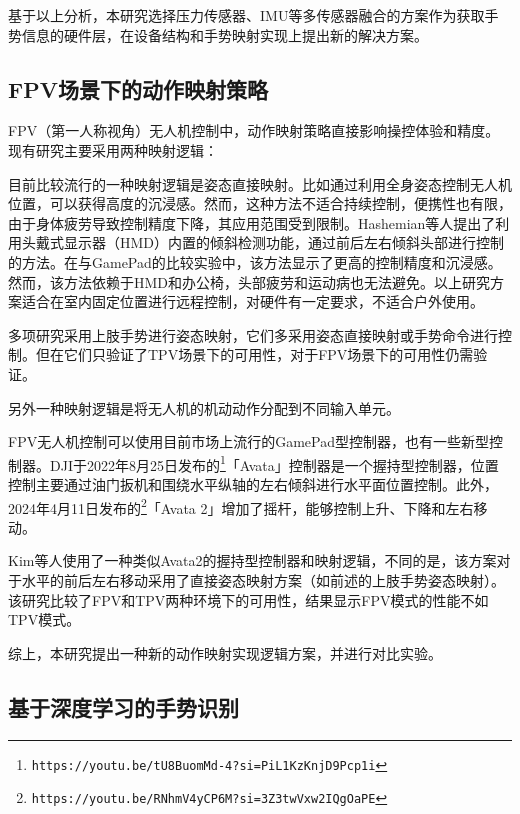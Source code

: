 基于以上分析，本研究选择压力传感器、IMU等多传感器融合的方案作为获取手势信息的硬件层，在设备结构和手势映射实现上提出新的解决方案。

\subsection{FPV场景下的动作映射策略}\label{ssec:FPV-drone-rc}

FPV（第一人称视角）无人机控制中，动作映射策略直接影响操控体验和精度。现有研究主要采用两种映射逻辑：

目前比较流行的一种映射逻辑是姿态直接映射。比如通过利用全身姿态控制无人机位置，可以获得高度的沉浸感\cites{cherpillod2019embodied,rognon2018flyjacket}。然而，这种方法不适合持续控制，便携性也有限，由于身体疲劳导致控制精度下降，其应用范围受到限制。Hashemian等人\cites{hashemian2020headjoystick}提出了利用头戴式显示器（HMD）内置的倾斜检测功能，通过前后左右倾斜头部进行控制的方法。在与GamePad的比较实验中，该方法显示了更高的控制精度和沉浸感。然而，该方法依赖于HMD和办公椅，头部疲劳和运动病也无法避免。以上研究方案适合在室内固定位置进行远程控制，对硬件有一定要求，不适合户外使用。

多项研究采用上肢手势进行姿态映射\cites{mughees2020gesture,budiyanto2021navigation,muezzinouglu2021intelligent,lee2023wearable,cherpillod2019embodied,kim2022intuitive}，它们多采用姿态直接映射或手势命令进行控制。但在它们只验证了TPV场景下的可用性，对于FPV场景下的可用性仍需验证。

另外一种映射逻辑是将无人机的机动动作分配到不同输入单元。

FPV无人机控制可以使用目前市场上流行的GamePad型控制器，也有一些新型控制器。DJI于2022年8月25日发布的\footnote{\texttt{https://youtu.be/tU8BuomMd-4?si=PiL1KzKnjD9Pcp1i}}「Avata」控制器是一个握持型控制器，位置控制主要通过油门扳机和围绕水平纵轴的左右倾斜进行水平面位置控制。此外，2024年4月11日发布的\footnote{\texttt{https://youtu.be/RNhmV4yCP6M?si=3Z3twVxw2IQgOaPE}}「Avata 2」增加了摇杆，能够控制上升、下降和左右移动。

Kim等人\cites{kim2022intuitive}使用了一种类似Avata2的握持型控制器和映射逻辑，不同的是，该方案对于水平的前后左右移动采用了直接姿态映射方案（如前述的上肢手势姿态映射\cites{mughees2020gesture}）。该研究比较了FPV和TPV两种环境下的可用性，结果显示FPV模式的性能不如TPV模式。

综上，本研究提出一种新的动作映射实现逻辑方案，并进行对比实验。

\subsection{基于深度学习的手势识别}


